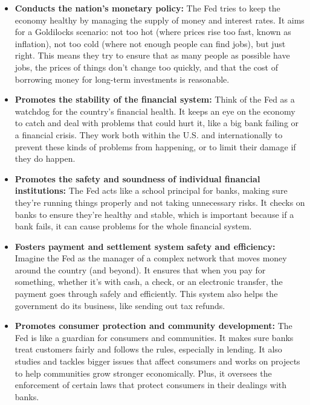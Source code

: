 \documentclass{report}
\begin{document}
        \begin{itemize}
            \item \textbf{Conducts the nation’s monetary policy:} The Fed tries to keep the economy healthy by managing the supply of money and interest rates. It aims for a Goldilocks scenario: not too hot (where prices rise too fast, known as inflation), not too cold (where not enough people can find jobs), but just right. This means they try to ensure that as many people as possible have jobs, the prices of things don't change too quickly, and that the cost of borrowing money for long-term investments is reasonable.
            \item \textbf{Promotes the stability of the financial system:} Think of the Fed as a watchdog for the country's financial health. It keeps an eye on the economy to catch and deal with problems that could hurt it, like a big bank failing or a financial crisis. They work both within the U.S. and internationally to prevent these kinds of problems from happening, or to limit their damage if they do happen.
            \item \textbf{Promotes the safety and soundness of individual financial institutions:} The Fed acts like a school principal for banks, making sure they're running things properly and not taking unnecessary risks. It checks on banks to ensure they're healthy and stable, which is important because if a bank fails, it can cause problems for the whole financial system.
            \item \textbf{Fosters payment and settlement system safety and efficiency:} Imagine the Fed as the manager of a complex network that moves money around the country (and beyond). It ensures that when you pay for something, whether it's with cash, a check, or an electronic transfer, the payment goes through safely and efficiently. This system also helps the government do its business, like sending out tax refunds.
            \item \textbf{Promotes consumer protection and community development:} The Fed is like a guardian for consumers and communities. It makes sure banks treat customers fairly and follows the rules, especially in lending. It also studies and tackles bigger issues that affect consumers and works on projects to help communities grow stronger economically. Plus, it oversees the enforcement of certain laws that protect consumers in their dealings with banks.
        \end{itemize}

        \bigbreak \noindent 
\end{document}

